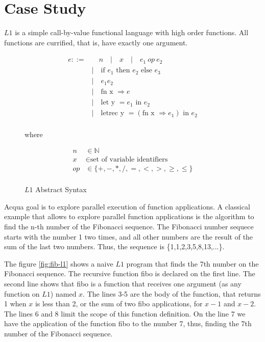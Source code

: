 \chapter{Case Study}

\iffalse 
$L1$ is a simple call-by-value functional language with high order functions. All functions are currified, that is, have exactly one argument.

\begin{figure}
  \caption{$L1$ Abstract Syntax}
  \begin{openframe}
    \begin{align*}
      e ::= & \quad n \quad |\quad x \quad | \quad e_1 \: op \: e_2 \\
        & |\quad \text{if } e_1 \text{ then } e_2 \text{ else } e_3 \\
        & |\quad e_1 e_2 \\
        & |\quad \text{fn x } \Rightarrow e \\
        & |\quad \text{let y } = e_1 \text{ in } e_2 \\
        & |\quad \text{letrec y } = (\text{fn x } \Rightarrow e_1) \text{ in } e_2 \\
    \end{align*}

    where

    \begin{align*}
      n & \in \mathbb{N} \\
      x & \in \text{set of variable identifiers} \\
      op & \in \{+, -, *, /,  =, <, >, \geq, \leq \} \\
    \end{align*}
  \end{openframe}
\end{figure}

Acqua goal is to explore parallel execution of function applications. A classical example that allows to explore parallel function applications is the algorithm to find the n-th number of the Fibonacci sequence. The Fibonacci number sequece starts with the number 1 two times, and all other numbers are the result of the sum of the last two numbers. Thus, the sequence is \{1,1,2,3,5,8,13,...\}.

The figure \ref{fig:fib-l1} shows a naive $L1$ program that finds the 7th number on the Fibonacci sequence. The recursive function fibo is declared on the first line. The second line shows that fibo is a function that receives one argument (as any function on $L1$) named $x$. The lines 3-5 are the body of the function, that returns 1 when $x$ is less than 2, or the sum of two fibo applications, for $x-1$ and $x-2$. The lines 6 and 8 limit the scope of this function definition. On the line 7 we have the application of the function fibo to the number 7, thus, finding the 7th number of the Fibonacci sequence.

